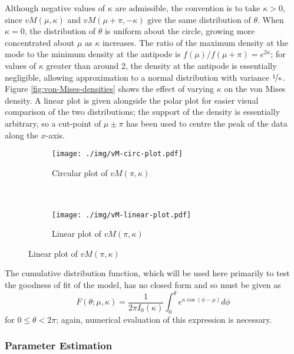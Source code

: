 \documentclass[../../ArchStats.tex]{subfiles}
\begin{document}
Although negative values of $\kappa$ are admissible, the convention is to take $\kappa > 0$, since $vM(\mu, \kappa)$ and $vM(\mu + \pi, -\kappa)$ give the same distribution of $\theta$. When $\kappa = 0$, the distribution of $\theta$ is uniform about the circle, growing more concentrated about $\mu$ as $\kappa$ increases.  The ratio of the maximum density at the mode to the minimum density at the antipode is $f(\mu) / f(\mu + \pi) = e^{2\kappa}$; for values of $\kappa$ greater than around 2, the density at the antipode is essentially negligible, allowing approximation to a normal distribution with variance $\nicefrac{1}{\kappa}$. Figure \ref{fig:von-Mises-densities} shows the effect of varying $\kappa$ on the von Mises density. A linear plot is given alongside the polar plot for easier visual comparison of the two distributions; the support of the density is essentially arbitrary, so a cut-point of $\mu \pm \pi$ has been used to centre the peak of the data along the $x$-axis.
 
\begin{figure}[!ht]
\centering
\caption{von Mises densities with $\mu = \pi$ and varying $\kappa$.}
\label{fig:von-Mises-densities}
%
\begin{subfigure}[t]{0.47\textwidth}
\centering
\caption{Circular plot of $vM(\pi, \kappa)$ \\ \textcolor{white}{spacer} \\ \textcolor{white}{spacer}}
\texttt{[image: ./img/vM-circ-plot.pdf]}
\end{subfigure}
%
\begin{subfigure}[t]{0.47\textwidth}
\centering
\caption{Linear plot of $vM(\pi, \kappa)$}
\texttt{[image: ./img/vM-linear-plot.pdf]}
\end{subfigure}
%
\end{figure}



The cumulative distribution function, which will be used here primarily to test the goodness of fit of the model, has no closed form and so must be given as
	\begin{equation}
	F(\theta; \mu, \kappa) = \frac{1}{2\pi I_0(\kappa)} \int_0^\theta e^{\kappa \cos(\phi - \mu)}d\phi
	\end{equation}
for $0 \leq \theta < 2\pi$; again, numerical evaluation of this expression is necessary.
 


\subsubsection{Parameter Estimation}
\label{sec:vM-params}
\end{document}
